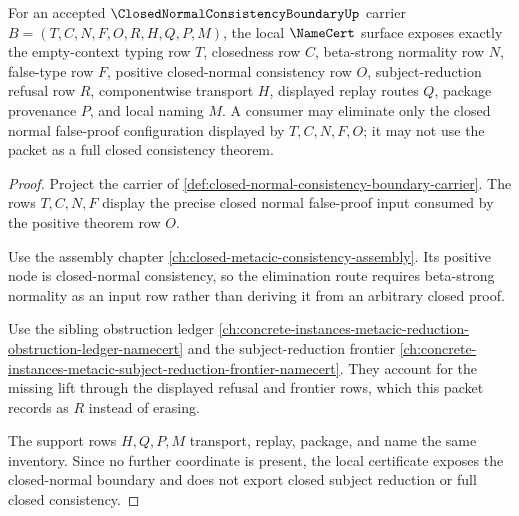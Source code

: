 \begin{theorem}
\label{thm:closed-normal-consistency-boundary-namecert-obligations}
For an accepted $\ClosedNormalConsistencyBoundaryUp$ carrier $B=(T,C,N,F,O,R,H,Q,P,M)$, the local $\NameCert$ surface exposes exactly the empty-context typing row $T$, closedness row $C$, beta-strong normality row $N$, false-type row $F$, positive closed-normal consistency row $O$, subject-reduction refusal row $R$, componentwise transport $H$, displayed replay routes $Q$, package provenance $P$, and local naming $M$. A consumer may eliminate only the closed normal false-proof configuration displayed by $T,C,N,F,O$; it may not use the packet as a full closed consistency theorem.
\end{theorem}
\begin{proof}
Project the carrier of \autoref{def:closed-normal-consistency-boundary-carrier}. The rows $T,C,N,F$ display the precise closed normal false-proof input consumed by the positive theorem row $O$.

Use the assembly chapter \autoref{ch:closed-metacic-consistency-assembly}. Its positive node is closed-normal consistency, so the elimination route requires beta-strong normality as an input row rather than deriving it from an arbitrary closed proof.

Use the sibling obstruction ledger \autoref{ch:concrete-instances-metacic-reduction-obstruction-ledger-namecert} and the subject-reduction frontier \autoref{ch:concrete-instances-metacic-subject-reduction-frontier-namecert}. They account for the missing lift through the displayed refusal and frontier rows, which this packet records as $R$ instead of erasing.

The support rows $H,Q,P,M$ transport, replay, package, and name the same inventory. Since no further coordinate is present, the local certificate exposes the closed-normal boundary and does not export closed subject reduction or full closed consistency.
\end{proof}

